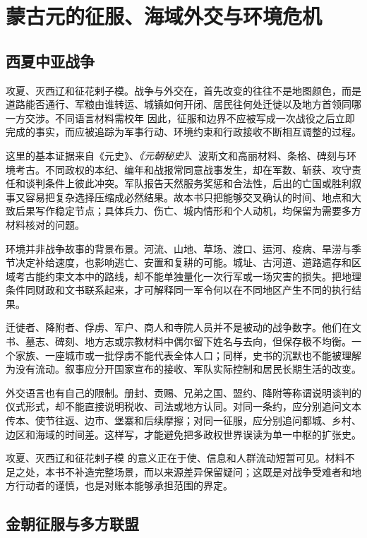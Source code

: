 \section{蒙古元的征服、海域外交与环境危机}

\subsection{西夏中亚战争}

攻夏、灭西辽和征花剌子模。战争与外交在，首先改变的往往不是地图颜色，而是道路能否通行、军粮由谁转运、城镇如何开闭、居民往何处迁徙以及地方首领同哪一方交涉。不同语言材料需校年 因此，征服和边界不应被写成一次战役之后立即完成的事实，而应被追踪为军事行动、环境约束和行政接收不断相互调整的过程。

这里的基本证据来自《元史》、\textit{《元朝秘史》}、波斯文和高丽材料、条格、碑刻与环境考古。不同政权的本纪、编年和战报常同意战事发生，却在军数、斩获、攻守责任和谈判条件上彼此冲突。军队报告天然服务奖惩和合法性，后出的亡国或胜利叙事又容易把复杂选择压缩成必然结果。故本书只把能够交叉确认的时间、地点和大致后果写作稳定节点；具体兵力、伤亡、城内情形和个人动机，均保留为需要多方材料核对的问题。

环境并非战争故事的背景布景。河流、山地、草场、渡口、运河、疫病、旱涝与季节决定补给速度，也影响逃亡、安置和复耕的可能。城址、古河道、道路遗存和区域考古能约束文本中的路线，却不能单独量化一次行军或一场灾害的损失。把地理条件同财政和文书联系起来，才可解释同一军令何以在不同地区产生不同的执行结果。

迁徙者、降附者、俘虏、军户、商人和寺院人员并不是被动的战争数字。他们在文书、墓志、碑刻、地方志或宗教材料中偶尔留下姓名与去向，但保存极不均衡。一个家族、一座城市或一批俘虏不能代表全体人口；同样，史书的沉默也不能被理解为没有流动。叙事应分开国家宣布的接收、军队实际控制和居民长期生活的改变。

外交语言也有自己的限制。册封、贡赐、兄弟之国、盟约、降附等称谓说明谈判的仪式形式，却不能直接说明税收、司法或地方认同。对同一条约，应分别追问文本传本、使节往返、边市、堡寨和后续摩擦；对同一征服，应分别追问都城、乡村、边区和海域的时间差。这样写，才能避免把多政权世界误读为单一中枢的扩张史。

攻夏、灭西辽和征花剌子模 的意义正在于使、信息和人群流动短暂可见。材料不足之处，本书不补造完整场景，而以来源差异保留疑问；这既是对战争受难者和地方行动者的谨慎，也是对账本能够承担范围的界定。

\subsection{金朝征服与多方联盟}


